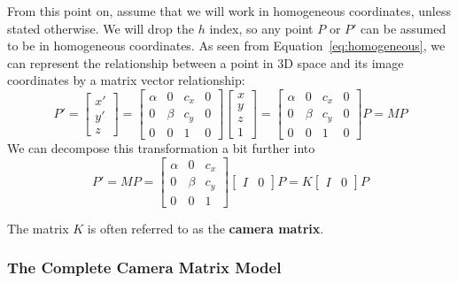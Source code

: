 \documentclass[a4paper, 12pt]{article}
\renewcommand\emph{\textbf}
\begin{document}
From this point on, assume that we will work in homogeneous coordinates, unless stated otherwise. We will drop the $h$ index, so any point $P$ or $P'$ can be assumed to be in homogeneous coordinates. As seen from Equation~\ref{eq:homogeneous}, we can represent the relationship between a point in 3D space and its image coordinates by a matrix vector relationship:
\begin{equation}
    P' = \begin{bmatrix}x'\\y'\\ z\end{bmatrix}=\begin{bmatrix}
    \alpha & 0 & c_x & 0\\
    0 & \beta & c_y & 0 \\ 
    0 & 0 & 1 & 0
    \end{bmatrix}\begin{bmatrix}x\\y\\z\\1\end{bmatrix}=
    \begin{bmatrix}
    \alpha & 0 & c_x & 0\\
    0 & \beta & c_y & 0 \\ 
    0 & 0 & 1 & 0
    \end{bmatrix}P = MP 
    \label{eq:canonical}
\end{equation}
We can decompose this transformation a bit further into 
\begin{equation}
P' = MP = \begin{bmatrix}
    \alpha & 0 & c_x \\
    0 & \beta & c_y  \\ 
    0 & 0 & 1 
    \end{bmatrix}\begin{bmatrix}I & 0\end{bmatrix}P = K\begin{bmatrix}I & 0\end{bmatrix}P
    \label{eq:decomposedHomogenousTransform}
\end{equation}

The matrix $K$ is often referred to as the \emph{camera matrix}. 

\subsubsection{The Complete Camera Matrix Model}
\end{document}
